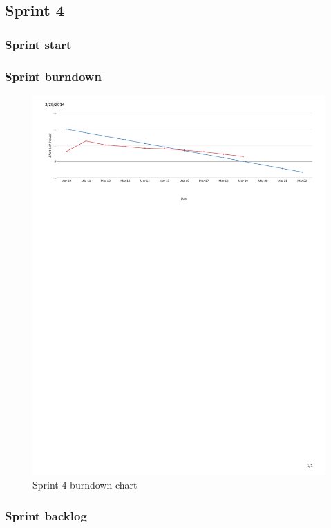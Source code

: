 \subsection{Sprint 4}
\subsubsection{Sprint start}


\subsubsection{Sprint burndown}


\begin{figure}[H]
\includegraphics[width=\textwidth, trim= 1cm 21cm 1cm 1cm, clip=true]{ch/projectManagement/fig/burndown4.pdf}
\caption{Sprint 4 burndown chart}
\label{fig:sprint4burndown}
\end{figure}

\subsubsection{Sprint backlog}

